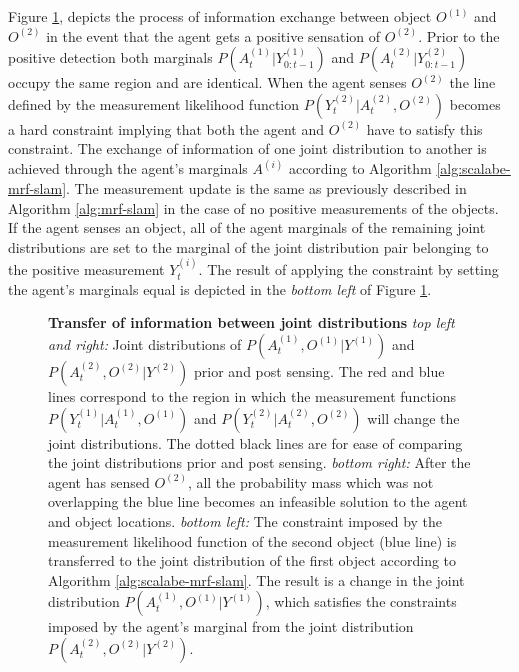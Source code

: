 \documentclass[review]{elsarticle}
\numberwithin{equation}{section}
\begin{document}
Figure \ref{fig:transfer_information}, depicts the process of information exchange between object $O^{(1)}$ and $O^{(2)}$ in the event that the agent 
gets a positive sensation of $O^{(2)}$. Prior to the positive detection both marginals $P(A^{(1)}_t|Y^{(1)}_{0:t-1})$ and $P(A^{(2)}_t|Y^{(2)}_{0:t-1})$ 
occupy the same region and are identical. When the agent senses $O^{(2)}$ the line defined by the measurement 
likelihood function $P(Y^{(2)}_t|A^{(2)}_t,O^{(2)})$ becomes a hard constraint implying that both the agent and $O^{(2)}$ have to satisfy this constraint.
The exchange of information of one joint distribution to another is achieved through the agent's marginals $A^{(i)}$ according to Algorithm \ref{alg:scalabe-mrf-slam}.
The measurement update is the same as previously described in Algorithm \ref{alg:mrf-slam} in the case of no positive measurements of the objects. If the agent
senses an object, all of the agent marginals of the remaining joint distributions are set to the marginal of the joint distribution pair belonging to the positive 
measurement $Y^{(i)}_t$. The result of applying the constraint by setting the agent's marginals equal is depicted in the \textit{bottom left} of Figure \ref{fig:transfer_information}.

\begin{figure}
  \centering
  \caption{\textbf{Transfer of information between joint distributions} \textit{top left and right:} Joint distributions of 
   $P(A^{(1)}_t,O^{(1)}|Y^{(1)})$ and $P(A^{(2)}_t,O^{(2)}|Y^{(2)})$ prior and post sensing. The red and blue lines correspond 
  to the region in which the measurement functions $P(Y^{(1)}_{t}|A^{(1)}_t,O^{(1)})$ and $P(Y^{(2)}_{t}|A^{(2)}_t,O^{(2)})$ will change the joint distributions.
  The dotted black lines are for ease of comparing the joint distributions prior and post sensing.
  \textit{bottom right:}  After the agent has sensed $O^{(2)}$, all the probability mass which was not overlapping the blue line becomes an infeasible
  solution to the agent and object locations. \textit{bottom left:} The constraint imposed by the measurement likelihood function of the second object
  (blue line) is transferred to the joint distribution of the first object according to Algorithm \ref{alg:scalabe-mrf-slam}.
  The result is a change in the joint distribution  $P(A^{(1)}_t,O^{(1)}|Y^{(1)})$, which satisfies the constraints 
  imposed by the agent's marginal from the joint distribution $P(A^{(2)}_t,O^{(2)}|Y^{(2)})$.}
  \label{fig:transfer_information}
\end{figure}
\end{document}
